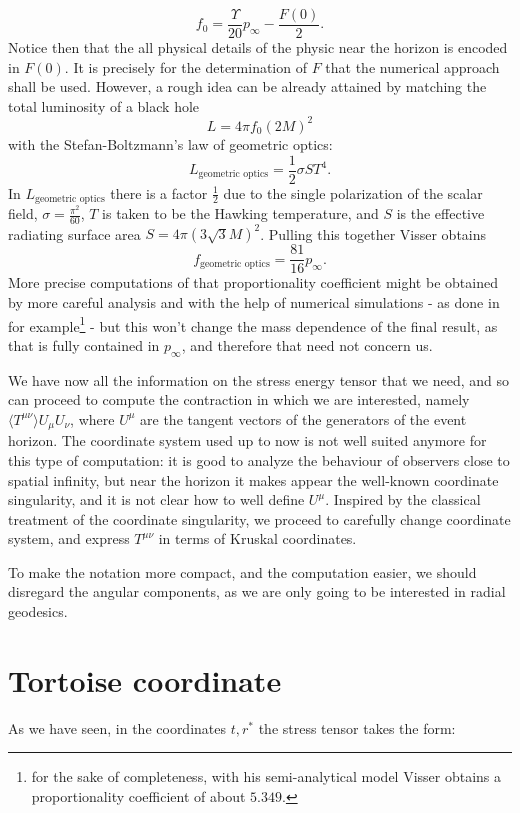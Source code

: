 \[
f_0 = \frac{\Upsilon}{20}p_{\infty} - \frac{F(0)}{2}.
\]
Notice then that the all physical details of the physic near the horizon is encoded in \(F(0)\). It is precisely for the determination of \(F\) that the numerical approach shall be used. However, a rough idea can be already attained by matching the total luminosity of a black hole
\[
    L = 4\pi f_0(2M)^2
\]
with the Stefan-Boltzmann's law of geometric optics:
\[
L_{\text{geometric optics}} = \frac{1}{2}\sigma S T^4.  
\]
In \(L_{\text{geometric optics}}\) there is a factor \(\frac{1}{2}\) due to the single polarization of the scalar field, \(\sigma = \frac{\pi^2}{60}\), \(T\) is taken to be the Hawking temperature, and \(S\) is the effective radiating surface area \(S = 4\pi(3\sqrt{3}M)^2\). Pulling this together Visser obtains
\[
 f_{\text{geometric optics}} = \frac{81}{16}p_{\infty}.
\]
More precise computations of that proportionality coefficient might be obtained by more careful analysis and with the help of numerical simulations - as done in~\cite[]{visser1997gravitational} for example\footnote{for the sake of completeness, with his semi-analytical model Visser obtains a proportionality coefficient of about \(5.349\).} - but this won't change the mass dependence of the final result, as that is fully contained in \(p_{\infty}\), and therefore that need not concern us.

We have now all the information on the stress energy tensor that we need, and so can proceed to compute the contraction in which we are interested, namely \(\langle T^{\mu\nu}\rangle U_{\mu}U_{\nu}\), where \(U^{\mu}\) are the tangent vectors of the generators of the event horizon.
The coordinate system used up to now is not well suited anymore for this type of computation: it is good to analyze the behaviour of observers close to spatial infinity, but near the horizon it makes appear the well-known coordinate singularity, and it is not clear how to well define \(U^{\mu}\). Inspired by the classical treatment of the coordinate singularity, we proceed to carefully change coordinate system, and express \(T^{\mu\nu}\) in terms of Kruskal coordinates.

To make the notation more compact, and the computation easier, we should disregard the angular components, as we are only going to be interested in radial geodesics.

\section{Tortoise coordinate}
As we have seen, in the coordinates \(t, r^*\) the stress tensor takes the form:


